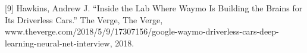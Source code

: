 \documentclass{article}
\begin{document}
\label{[9]}[9] Hawkins, Andrew J. “Inside the Lab Where Waymo Is Building 
the Brains for Its Driverless Cars.” The Verge, The Verge, 
www.theverge.com/2018/5/9/17307156/google-waymo-driverless-cars-deep-learning-neural-net-interview, 2018.


\end{document}
